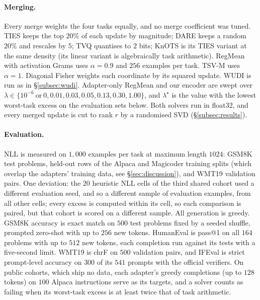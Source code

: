 \paragraph{Merging.} Every merge weights the four tasks equally, and no merge
coefficient was tuned. TIES keeps the top $20\%$ of each update by magnitude;
DARE keeps a random $20\%$ and rescales by $5$; TVQ quantises to $2$ bits; KnOTS
is its TIES variant at the same density (its linear variant is algebraically
task arithmetic). RegMean with activation Grams uses $\alpha = 0.9$ and $256$
examples per task. TSV-M uses $\alpha = 1$. Diagonal Fisher weights each
coordinate by its squared update. WUDI is run as in \S\ref{subsec:wudi}.
Adapter-only RegMean and our encoder are swept over
$\lambda \in \{10^{-6}\ \text{or}\ 0, 0.01, 0.03, 0.05, 0.13, 0.30, 1.00\}$,
and $\lambda^\star$ is the value with the lowest worst-task excess on the
evaluation sets below. Both solvers run in float32, and every merged update is
cut to rank $r$ by a randomised SVD (\S\ref{subsec:results}).

\paragraph{Evaluation.} NLL is measured on $1{,}000$ examples per task at
maximum length $1024$: GSM8K test problems, held-out rows of the Alpaca and
Magicoder training splits (which overlap the adapters' training data, see
\S\ref{sec:discussion}), and WMT19 validation pairs. One deviation: the $20$
heuristic NLL cells of the third shared cohort used a different evaluation seed,
and so a different sample of evaluation examples, from all other cells; every
excess is computed within its cell, so each comparison is paired, but that
cohort is scored on a different sample. All generation is greedy. GSM8K
accuracy is exact match on $500$ test problems fixed by a seeded shuffle,
prompted zero-shot with up to $256$ new tokens. HumanEval is pass@1 on all
$164$ problems with up to $512$ new tokens, each completion run against its
tests with a five-second limit. WMT19 is chrF on $500$ validation pairs,
and IFEval is strict prompt-level accuracy on $300$ of its $541$ prompts with
the official verifiers. On public cohorts, which ship no data, each adapter's
greedy completions (up to $128$ tokens) on $100$ Alpaca instructions serve as
its targets, and a solver counts as failing when its worst-task excess is at
least twice that of task arithmetic.
